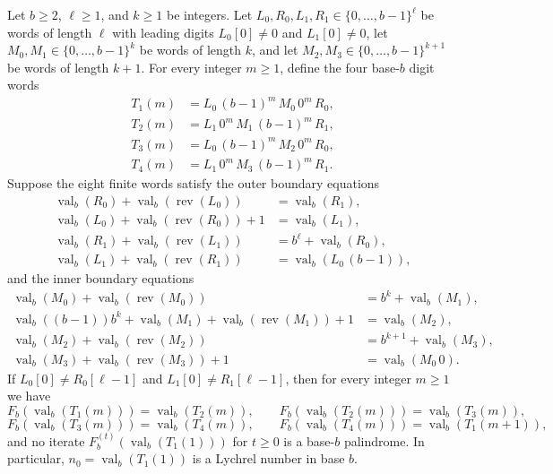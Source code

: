 \documentclass[12pt,reqno]{article}
\DeclareMathOperator{\Rev}{rev}
\DeclareMathOperator{\val}{val}
\begin{document}
\begin{theorem}\label{thm:closure}
Let $b \geq 2$, $\ell \geq 1$, and $k \geq 1$ be integers. Let $L_0, R_0, L_1, R_1 \in \{0, \ldots, b-1\}^\ell$ be words of length $\ell$ with leading digits $L_0[0] \neq 0$ and $L_1[0] \neq 0$, let $M_0, M_1 \in \{0, \ldots, b-1\}^k$ be words of length $k$, and let $M_2, M_3 \in \{0, \ldots, b-1\}^{k+1}$ be words of length $k+1$. For every integer $m \geq 1$, define the four base-$b$ digit words
\begin{align}
T_1(m) &= L_0 \, (b-1)^m \, M_0 \, 0^m \, R_0, \label{eq:T1}\\
T_2(m) &= L_1 \, 0^m \, M_1 \, (b-1)^m \, R_1, \label{eq:T2}\\
T_3(m) &= L_0 \, (b-1)^m \, M_2 \, 0^m \, R_0, \label{eq:T3}\\
T_4(m) &= L_1 \, 0^m \, M_3 \, (b-1)^m \, R_1. \label{eq:T4}
\end{align}
Suppose the eight finite words satisfy the outer boundary equations
\begin{align}
\val_b(R_0) + \val_b(\Rev(L_0)) &= \val_b(R_1), \label{eq:out1}\\
\val_b(L_0) + \val_b(\Rev(R_0)) + 1 &= \val_b(L_1), \label{eq:out2}\\
\val_b(R_1) + \val_b(\Rev(L_1)) &= b^\ell + \val_b(R_0), \label{eq:out3}\\
\val_b(L_1) + \val_b(\Rev(R_1)) &= \val_b(L_0 \, (b-1)), \label{eq:out4}
\end{align}
and the inner boundary equations
\begin{align}
\val_b(M_0) + \val_b(\Rev(M_0)) &= b^k + \val_b(M_1), \label{eq:in1}\\
\val_b((b-1)) b^k + \val_b(M_1) + \val_b(\Rev(M_1)) + 1 &= \val_b(M_2), \label{eq:in2}\\
\val_b(M_2) + \val_b(\Rev(M_2)) &= b^{k+1} + \val_b(M_3), \label{eq:in3}\\
\val_b(M_3) + \val_b(\Rev(M_3)) + 1 &= \val_b(M_0 \, 0). \label{eq:in4}
\end{align}
If $L_0[0] \neq R_0[\ell-1]$ and $L_1[0] \neq R_1[\ell-1]$, then for every integer $m \geq 1$ we have
\begin{displaymath}
F_b(\val_b(T_1(m))) = \val_b(T_2(m)), \qquad F_b(\val_b(T_2(m))) = \val_b(T_3(m)),
\end{displaymath}
\begin{displaymath}
F_b(\val_b(T_3(m))) = \val_b(T_4(m)), \qquad F_b(\val_b(T_4(m))) = \val_b(T_1(m+1)),
\end{displaymath}
and no iterate $F_b^{(t)}(\val_b(T_1(1)))$ for $t \geq 0$ is a base-$b$ palindrome. In particular, $n_0 = \val_b(T_1(1))$ is a Lychrel number in base $b$.
\end{theorem}
\end{document}
